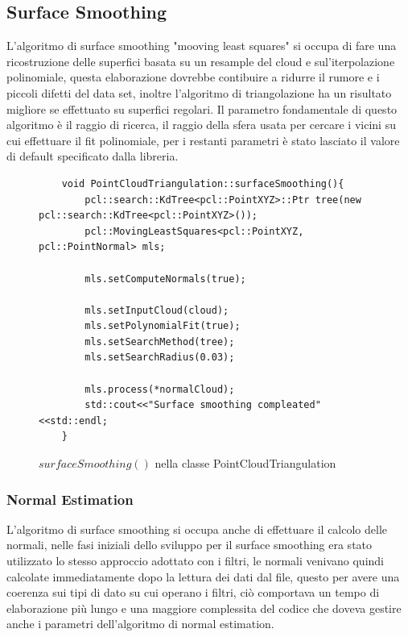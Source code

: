 \documentclass[a4paper,12pt]{article}
\begin{document}
	\subsection{Surface Smoothing}
	L'algoritmo di surface smoothing "mooving least squares" si occupa di fare una ricostruzione delle superfici basata su 
	un resample del cloud e sul'iterpolazione polinomiale, questa elaborazione dovrebbe contibuire a ridurre il rumore e i
	piccoli difetti del data set, inoltre l'algoritmo di triangolazione ha un risultato migliore se effettuato su superfici
	regolari. Il parametro fondamentale di questo algoritmo è il raggio di ricerca, il raggio della sfera usata per cercare i
	vicini su cui effettuare il fit polinomiale, per i restanti parametri è stato lasciato il valore di default specificato
	dalla libreria.
	\begin{figure}[H]
	\begin{lstlisting}
	void PointCloudTriangulation::surfaceSmoothing(){
    	pcl::search::KdTree<pcl::PointXYZ>::Ptr tree(new pcl::search::KdTree<pcl::PointXYZ>());
    	pcl::MovingLeastSquares<pcl::PointXYZ, pcl::PointNormal> mls;

    	mls.setComputeNormals(true);

    	mls.setInputCloud(cloud);
    	mls.setPolynomialFit(true);
    	mls.setSearchMethod(tree);
    	mls.setSearchRadius(0.03);

    	mls.process(*normalCloud);
    	std::cout<<"Surface smoothing compleated"<<std::endl;
	}
	\end{lstlisting}
	\caption{$surfaceSmoothing()$ nella classe PointCloudTriangulation}
	\label{mls}
	\end{figure}	 
		\subsubsection{Normal Estimation}
		L'algoritmo di surface smoothing si occupa anche di effettuare il calcolo delle normali, nelle fasi 
		iniziali dello sviluppo per il surface smoothing era stato utilizzato lo stesso approccio adottato con i filtri,
		le normali venivano quindi calcolate immediatamente dopo la lettura dei dati dal file, questo per avere una
		coerenza sui tipi di dato su cui operano i filtri, ciò comportava un tempo di elaborazione più lungo 
		e una maggiore complessita del codice che doveva gestire anche i parametri dell'algoritmo di normal estimation.
	\clearpage
\end{document}
